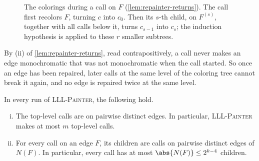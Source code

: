 \begin{figure}[H]
    \centering
    \caption{The colorings during a call on \(F\) (\autoref{lem:repainter-returns}). The call first recolors \(F\), turning \(c\) into \(c_{0}\). Then its \(s\)-th child, on \(F^{(s)}\), together with all calls below it, turns \(c_{s-1}\) into \(c_{s}\); the induction hypothesis is applied to these \(r\) smaller subtrees.}
    \label{fig:repainter-colorings}
\end{figure}

By (ii) of \autoref{lem:repainter-returns}, read contrapositively, a call never makes an edge monochromatic that was not monochromatic when the call started. So once an edge has been repaired, later calls at the same level of the coloring tree cannot break it again, and no edge is repaired twice at the same level.

\begin{corollary}\label{cor:top-level-once}
    In every run of \textsc{LLL-Painter}, the following hold.
    \begin{enumerate}[(i)]
        \item The top-level calls are on pairwise distinct edges. In particular, \textsc{LLL-Painter} makes at most \(m\) top-level calls.
        \item For every call on an edge \(F\), its children are calls on pairwise distinct edges of \(N(F)\). In particular, every call has at most \(\abs{N(F)} \le 2^{k-4}\) children.
    \end{enumerate}
\end{corollary}

